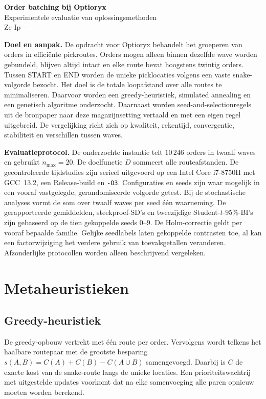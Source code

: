 \documentclass[a4paper,11pt]{article}
\newcommand{\dist}{\ensuremath{D}}
\begin{document}
\raggedbottom

\begin{center}
  {\LARGE\bfseries Order batching bij Optioryx}\\[3pt]
  {\large Experimentele evaluatie van oplossingsmethoden}\\[5pt]
  {Ze Ip \enspace--}
\end{center}
\vspace{4pt}

\textbf{Doel en aanpak.} De opdracht voor Optioryx behandelt het groeperen van
orders in efficiënte pickroutes. Orders mogen alleen binnen dezelfde wave worden
gebundeld, blijven altijd intact en elke route bevat hoogstens twintig orders.
Tussen START en END worden de unieke picklocaties volgens een vaste
snake-volgorde bezocht. Het doel is de totale loopafstand over alle routes te
minimaliseren. Daarvoor worden een greedy-heuristiek, simulated annealing en een
genetisch algoritme onderzocht. Daarnaast worden seed-and-selectionregels uit de
bronpaper naar deze magazijnsetting vertaald en met een eigen regel uitgebreid.
De vergelijking richt zich op kwaliteit, rekentijd, convergentie, stabiliteit en
verschillen tussen waves.

\textbf{Evaluatieprotocol.} De onderzochte instantie telt $10\,246$ orders in
twaalf waves en gebruikt $n_{\max}=20$. De doelfunctie \dist{} sommeert alle
routeafstanden. De gecontroleerde tijdstudies zijn serieel uitgevoerd op een
Intel Core i7-8750H met GCC~13.2, een
Release-build en \texttt{-O3}. Configuraties en seeds zijn waar mogelijk in een
vooraf vastgelegde, gerandomiseerde volgorde getest. Bij de stochastische
analyses vormt de som over twaalf waves per seed één waarneming. De gerapporteerde
gemiddelden, steekproef-SD's en tweezijdige Student-$t$-95\%-BI's zijn gebaseerd
op de tien gekoppelde seeds 0--9. De Holm-correctie geldt per vooraf bepaalde familie. Gelijke
seedlabels laten gekoppelde contrasten toe, al kan een factorwijziging het
verdere gebruik van toevalsgetallen veranderen. Afzonderlijke protocollen worden
alleen beschrijvend vergeleken.

\section{Metaheuristieken}

\subsection{Greedy-heuristiek}
De greedy-opbouw vertrekt met één route per order. Vervolgens wordt telkens het
haalbare routepaar met de grootste besparing
$s(A,B)=C(A)+C(B)-C(A\cup B)$ samengevoegd. Daarbij is $C$ de exacte kost van
de snake-route langs de unieke locaties. Een prioriteitswachtrij met
uitgestelde updates voorkomt dat na elke samenvoeging alle paren opnieuw moeten
worden berekend.
\end{document}
